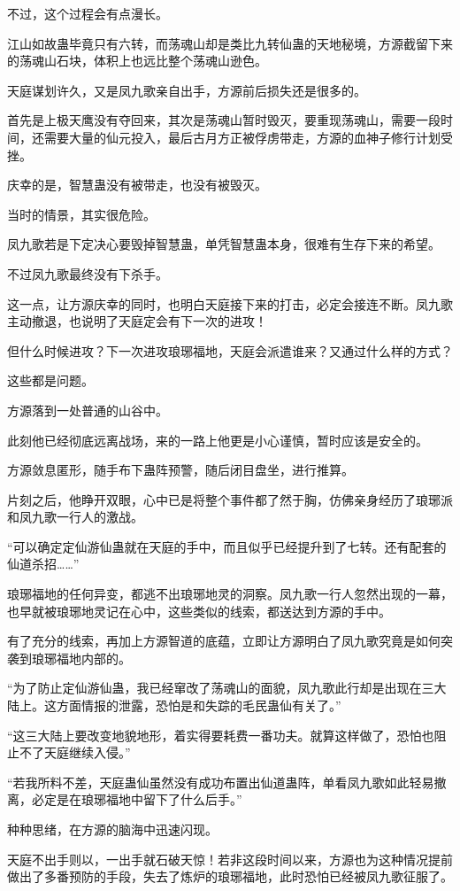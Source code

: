 \begin{this_body}
不过，这个过程会有点漫长。

江山如故蛊毕竟只有六转，而荡魂山却是类比九转仙蛊的天地秘境，方源截留下来的荡魂山石块，体积上也远比整个荡魂山逊色。

天庭谋划许久，又是凤九歌亲自出手，方源前后损失还是很多的。

首先是上极天鹰没有夺回来，其次是荡魂山暂时毁灭，要重现荡魂山，需要一段时间，还需要大量的仙元投入，最后古月方正被俘虏带走，方源的血神子修行计划受挫。

庆幸的是，智慧蛊没有被带走，也没有被毁灭。

当时的情景，其实很危险。

凤九歌若是下定决心要毁掉智慧蛊，单凭智慧蛊本身，很难有生存下来的希望。

不过凤九歌最终没有下杀手。

这一点，让方源庆幸的同时，也明白天庭接下来的打击，必定会接连不断。凤九歌主动撤退，也说明了天庭定会有下一次的进攻！

但什么时候进攻？下一次进攻琅琊福地，天庭会派遣谁来？又通过什么样的方式？

这些都是问题。

方源落到一处普通的山谷中。

此刻他已经彻底远离战场，来的一路上他更是小心谨慎，暂时应该是安全的。

方源敛息匿形，随手布下蛊阵预警，随后闭目盘坐，进行推算。

片刻之后，他睁开双眼，心中已是将整个事件都了然于胸，仿佛亲身经历了琅琊派和凤九歌一行人的激战。

“可以确定定仙游仙蛊就在天庭的手中，而且似乎已经提升到了七转。还有配套的仙道杀招……”

琅琊福地的任何异变，都逃不出琅琊地灵的洞察。凤九歌一行人忽然出现的一幕，也早就被琅琊地灵记在心中，这些类似的线索，都送达到方源的手中。

有了充分的线索，再加上方源智道的底蕴，立即让方源明白了凤九歌究竟是如何突袭到琅琊福地内部的。

“为了防止定仙游仙蛊，我已经窜改了荡魂山的面貌，凤九歌此行却是出现在三大陆上。这方面情报的泄露，恐怕是和失踪的毛民蛊仙有关了。”

“这三大陆上要改变地貌地形，着实得要耗费一番功夫。就算这样做了，恐怕也阻止不了天庭继续入侵。”

“若我所料不差，天庭蛊仙虽然没有成功布置出仙道蛊阵，单看凤九歌如此轻易撤离，必定是在琅琊福地中留下了什么后手。”

种种思绪，在方源的脑海中迅速闪现。

天庭不出手则以，一出手就石破天惊！若非这段时间以来，方源也为这种情况提前做出了多番预防的手段，失去了炼炉的琅琊福地，此时恐怕已经被凤九歌征服了。


\end{this_body}
